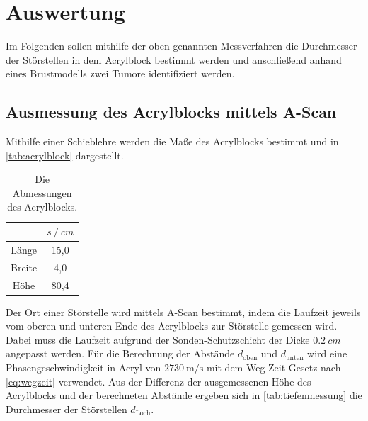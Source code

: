 \section{Auswertung}
\label{sec:Auswertung}

Im Folgenden sollen mithilfe der oben genannten Messverfahren die Durchmesser der Störstellen in dem Acrylblock bestimmt werden
und anschließend anhand eines Brustmodells zwei Tumore identifiziert werden.

\subsection{Ausmessung des Acrylblocks mittels A-Scan} \label{sec:a-scan}

Mithilfe einer Schieblehre werden die Maße des Acrylblocks bestimmt und in \autoref{tab:acrylblock} dargestellt.
\begin{table}
  \centering
  \caption{Die Abmessungen des Acrylblocks.}
  \label{tab:acrylblock}
  \begin{tabular}{c c}
    \toprule
    & $s \mathbin{/} \unit{cm}$ \\
    \midrule
    Länge   & 15,0 \\
    Breite  &  4,0 \\
    Höhe    & 80,4 \\
    \bottomrule
  \end{tabular}
\end{table}
Der Ort einer Störstelle wird mittels A-Scan bestimmt, indem die Laufzeit jeweils vom oberen und unteren Ende des Acrylblocks zur Störstelle gemessen wird.
Dabei muss die Laufzeit aufgrund der Sonden-Schutzschicht der Dicke $\qty{0.2}{cm}$ angepasst werden.
Für die Berechnung der Abstände $d_\text{oben}$ und $d_\text{unten}$ wird eine Phasengeschwindigkeit in Acryl
von $\qty{2730}{\meter\per\second}$ mit dem Weg-Zeit-Gesetz nach \autoref{eq:wegzeit} verwendet.
Aus der Differenz der ausgemessenen Höhe des Acrylblocks und der berechneten Abstände ergeben sich in \autoref{tab:tiefenmessung} die Durchmesser der Störstellen $d_\text{Loch}$.

